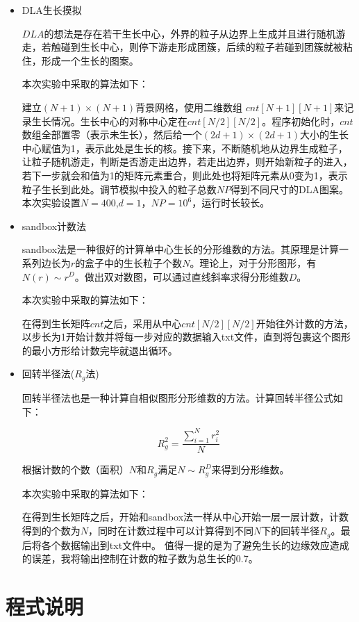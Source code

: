 \documentclass[UTF8]{ctexart}
\begin{document}
	\begin{itemize}
		\item DLA生长摸拟
		
		$DLA$的想法是存在若干生长中心，外界的粒子从边界上生成并且进行随机游走，若触碰到生长中心，则停下游走形成团簇，后续的粒子若碰到团簇就被粘住，形成一个生长的图案。
		
		本次实验中采取的算法如下：
		
		建立$(N+1)\times (N+1)$背景网格，使用二维数组 $cnt[N+1][N+1]$来记录生长情况。生长中心的对称中心定在$cnt[N/2][N/2]$。程序初始化时，$cnt$数组全部置零（表示未生长），然后给一个$(2d+1)\times(2d+1)$大小的生长中心赋值为1，表示此处是生长的核。接下来，不断随机地从边界生成粒子，让粒子随机游走，判断是否游走出边界，若走出边界，则开始新粒子的进入，若下一步就会和值为1的矩阵元素重合，则此处也将矩阵元素从0变为1，表示粒子生长到此处。调节模拟中投入的粒子总数$NP$得到不同尺寸的DLA图案。本次实验设置$N=400$,$d=1$，$NP=10^6$，运行时长较长。
		
		\item sandbox计数法
		
		sandbox法是一种很好的计算单中心生长的分形维数的方法。其原理是计算一系列边长为$r$的盒子中的生长粒子个数$N$。理论上，对于分形图形，有$N(r)\sim r^D$。做出双对数图，可以通过直线斜率求得分形维数$D$。
		
		本次实验中采取的算法如下：
		
		在得到生长矩阵$cnt$之后，采用从中心$cnt[N/2][N/2]$开始往外计数的方法，以步长为1开始计数并将每一步对应的数据输入txt文件，直到将包裹这个图形的最小方形给计数完毕就退出循环。
		
		\item 回转半径法($R_g$法)
		
		回转半径法也是一种计算自相似图形分形维数的方法。计算回转半径公式如下：
		
		$$R_g^2=\frac{\sum_{i=1}^N r_i^2}{N}$$
		
		根据计数的个数（面积）$N$和$R_g$满足$N\sim R_g^D$来得到分形维数。
		
		本次实验中采取的算法如下：
		
		在得到生长矩阵之后，开始和sandbox法一样从中心开始一层一层计数，计数得到的个数为$N$，同时在计数过程中可以计算得到不同$N$下的回转半径$R_g$。最后将各个数据输出到txt文件中。 值得一提的是为了避免生长的边缘效应造成的误差，我将输出控制在计数的粒子数为总生长的0.7。
	\end{itemize}
	
	\section{程式说明}
	
\end{document}
